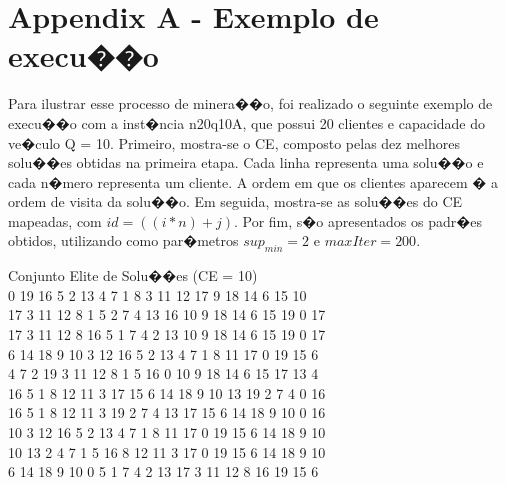 \chapter{Appendix A - Exemplo de execu��o}
\label{apend}


	Para ilustrar esse processo de minera��o, foi realizado o seguinte exemplo de execu��o com a inst�ncia n20q10A, que possui 20 clientes e capacidade do ve�culo Q = 10. Primeiro, mostra-se o CE, composto pelas dez melhores solu��es obtidas na primeira etapa. Cada linha representa uma solu��o e cada n�mero representa um cliente. A ordem em que os clientes aparecem � a ordem de visita da solu��o. Em seguida, mostra-se as solu��es do CE mapeadas, com $id = ((i*n)+j)$. Por fim, s�o apresentados os padr�es obtidos, utilizando como par�metros $sup_{min} = 2$ e $maxIter = 200$.
	
Conjunto Elite de Solu��es (CE = 10)\\

 0 19 16 5 2 13 4 7 1 8 3 11 12 17 9 18 14 6 15 10  \\
17 3 11 12 8 1 5 2 7 4 13 16 10 9 18 14 6 15 19 0 17  \\
17 3 11 12 8 16 5 1 7 4 2 13 10 9 18 14 6 15 19 0 17  \\
6 14 18 9 10 3 12 16 5 2 13 4 7 1 8 11 17 0 19 15 6   \\
4 7 2 19 3 11 12 8 1 5 16 0 10 9 18 14 6 15 17 13 4 \\
16 5 1 8 12 11 3 17 15 6 14 18 9 10 13 19 2 7 4 0 16 \\
16 5 1 8 12 11 3 19 2 7 4 13 17 15 6 14 18 9 10 0 16 \\
10 3 12 16 5 2 13 4 7 1 8 11 17 0 19 15 6 14 18 9 10 \\
10 13 2 4 7 1 5 16 8 12 11 3 17 0 19 15 6 14 18 9 10 \\
6 14 18 9 10 0 5 1 7 4 2 13 17 3 11 12 8 16 19 15 6 \\

